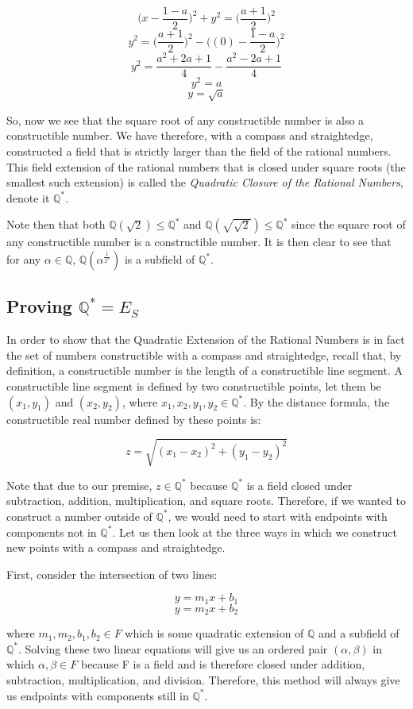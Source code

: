 \documentclass[]{article}
\begin{document}
  \[ \bigg(x-\frac{1-a}{2}\bigg)^2 + y^2 = \bigg(\frac{a+1}{2}\bigg)^2 \]
  \[ y^2 = \bigg(\frac{a+1}{2}\bigg)^2 - \bigg((0)-\frac{1-a}{2}\bigg)^2 \] 
  \[ y^2 = \frac{a^2+2a+1}{4} - \frac{a^2-2a+1}{4} \]
  \[ y^2 = a \]
  \[ y = \sqrt{a} \]
  
 So, now we see that the square root of any constructible number is also a constructible number. We have therefore, with a compass and straightedge, constructed a field that is strictly larger than the field of the rational numbers. This field extension of the rational numbers that is closed under square roots (the smallest such extension) is called the \emph{Quadratic Closure of the Rational Numbers}, denote it $\mathbb{Q}^*$.
 
 Note then that both $\mathbb{Q} (\sqrt{2}) \leq \mathbb{Q}^*$ and $\mathbb{Q} (\sqrt{\sqrt{2}}) \leq \mathbb{Q}^*$ since the square root of any constructible number is a constructible number. It is then clear to see that for any $\alpha \in \mathbb{Q}$, $\mathbb{Q} (\alpha ^ \frac{1}{2^n})$ is a subfield of $\mathbb{Q} ^*$.
 
 
  \subsection{Proving $\mathbb{Q}^* = E_S$}
  In order to show that the Quadratic Extension of the Rational Numbers is in fact the set of numbers constructible with a compass and straightedge, recall that, by definition, a constructible number is the length of a constructible line segment. A constructible line segment is defined by two constructible points, let them be $(x_1,y_1)$ and $(x_2,y_2)$, where $x_1,x_2,y_1,y_2 \in \mathbb{Q}^*$. By the distance formula, the constructible real number defined by these points is:
  
 \[z=\sqrt{(x_1-x_2)^2 + (y_1-y_2)^2}\]
  
  Note that due to our premise, $z \in \mathbb{Q}^*$ because $\mathbb{Q}^*$ is a field closed under subtraction, addition, multiplication, and square roots. Therefore, if we wanted to construct a number outside of $\mathbb{Q}^*$, we would need to start with endpoints with components not in $\mathbb{Q}^*$. Let us then look at the three ways in which we construct new points with a compass and straightedge.
  
  First, consider the intersection of two lines:
  
  \[y=m_1 x + b_1\]
  \[y=m_2 x + b_2\]
  
  where $m_1,m_2,b_1,b_2 \in F$ which is some quadratic extension of $\mathbb{Q}$ and a subfield of $\mathbb{Q}^*$. Solving these two linear equations will give us an ordered pair $(\alpha,\beta)$ in which $\alpha,\beta \in F$ because F is a field and is therefore closed under addition, subtraction, multiplication, and division. Therefore, this method will always give us endpoints with components still in $\mathbb{Q}^*$.
  
\end{document}
